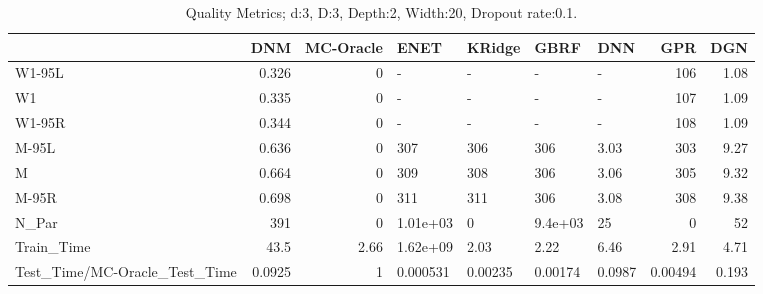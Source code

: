 \begin{table}
\centering
\caption{Quality Metrics; d:3, D:3, Depth:2, Width:20, Dropout rate:0.1.}
\begin{tabular}{lrrllllrr}
\toprule
{} &    DNM &  MC-Oracle &     ENET &  KRidge &    GBRF &    DNN &     GPR &   DGN \\
\midrule
W1-95L                        &  0.326 &          0 &        - &       - &       - &      - &     106 &  1.08 \\
W1                            &  0.335 &          0 &        - &       - &       - &      - &     107 &  1.09 \\
W1-95R                        &  0.344 &          0 &        - &       - &       - &      - &     108 &  1.09 \\
M-95L                         &  0.636 &          0 &      307 &     306 &     306 &   3.03 &     303 &  9.27 \\
M                             &  0.664 &          0 &      309 &     308 &     306 &   3.06 &     305 &  9.32 \\
M-95R                         &  0.698 &          0 &      311 &     311 &     306 &   3.08 &     308 &  9.38 \\
N\_Par                         &    391 &          0 & 1.01e+03 &       0 & 9.4e+03 &     25 &       0 &    52 \\
Train\_Time                    &   43.5 &       2.66 & 1.62e+09 &    2.03 &    2.22 &   6.46 &    2.91 &  4.71 \\
Test\_Time/MC-Oracle\_Test\_Time & 0.0925 &          1 & 0.000531 & 0.00235 & 0.00174 & 0.0987 & 0.00494 & 0.193 \\
\bottomrule
\end{tabular}
\end{table}
